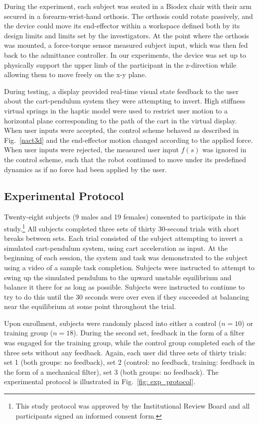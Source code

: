 During the experiment, each subject was seated in a Biodex chair with their arm secured in a forearm-wrist-hand orthosis. The orthosis could rotate passively, and the device could move its end-effector within a workspace defined both by its design limits and limits set by the investigators. At the point where the orthosis was mounted, a force-torque sensor measured subject input, which was then fed back to the admittance controller. In our experiments, the device was set up to physically support the upper limb of the participant in the z-direction while allowing them to move freely on the x-y plane. 

During testing, a display provided real-time visual state feedback to the user about the cart-pendulum system they were attempting to invert. High stiffness virtual springs in the haptic model were used to restrict user motion to a horizontal plane corresponding to the path of the cart in the virtual display. When user inputs were accepted, the control scheme behaved as described in Fig.~\ref{nact3d} and the end-effector motion changed according to the applied force. When user inputs were rejected, the measured user input $f(s)$ was ignored in the control scheme, such that the robot continued to move under its predefined dynamics as if no force had been applied by the user.

\subsection{Experimental Protocol} 

Twenty-eight subjects (9 males and 19 females) consented to participate in this study.\footnote{This study protocol was approved by the Institutional Review Board and all participants signed an informed consent form.} All subjects completed three sets of thirty 30-second trials with short breaks between sets. Each trial consisted of the subject attempting to invert a simulated cart-pendulum system, using cart acceleration as input. At the beginning of each session, the system and task was demonstrated to the subject using a video of a sample task completion. Subjects were instructed to attempt to swing up the simulated pendulum to the upward unstable equilibrium and balance it there for as long as possible. Subjects were instructed to continue to try to do this until the 30 seconds were over even if they succeeded at balancing near the equilibrium at some point throughout the trial.

Upon enrollment, subjects were randomly placed into either a control ($n=10$) or training group ($n=18$). During the second set, feedback in the form of a filter was engaged for the training group, while the control group completed each of the three sets without any feedback. Again, each user did three sets of thirty trials: set 1 (both groups: no feedback), set 2 (control: no feedback, training: feedback in the form of a mechanical filter), set 3 (both groups: no feedback). The experimental protocol is illustrated in Fig.~\ref{fig: exp_protocol}.

